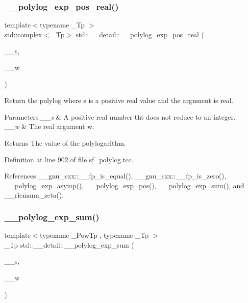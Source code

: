 \subsubsection{\texorpdfstring{\+\_\+\+\_\+polylog\+\_\+exp\+\_\+pos\+\_\+real()}{\_\_polylog\_exp\_pos\_real()}\hspace{0.1cm}{\footnotesize\ttfamily [2/2]}}
{\footnotesize\ttfamily template$<$typename \+\_\+\+Tp $>$ \\
std\+::complex$<$\+\_\+\+Tp$>$ std\+::\+\_\+\+\_\+detail\+::\+\_\+\+\_\+polylog\+\_\+exp\+\_\+pos\+\_\+real (\begin{DoxyParamCaption}\item[{\+\_\+\+Tp}]{\+\_\+\+\_\+s,  }\item[{\+\_\+\+Tp}]{\+\_\+\+\_\+w }\end{DoxyParamCaption})}

Return the polylog where s is a positive real value and the argument is real.


\begin{DoxyParams}{Parameters}
{\em \+\_\+\+\_\+s} & A positive real number tht does not reduce to an integer. \\
\hline
{\em \+\_\+\+\_\+w} & The real argument w. \\
\hline
\end{DoxyParams}
\begin{DoxyReturn}{Returns}
The value of the polylogarithm. 
\end{DoxyReturn}


Definition at line 902 of file sf\+\_\+polylog.\+tcc.



References \+\_\+\+\_\+gnu\+\_\+cxx\+::\+\_\+\+\_\+fp\+\_\+is\+\_\+equal(), \+\_\+\+\_\+gnu\+\_\+cxx\+::\+\_\+\+\_\+fp\+\_\+is\+\_\+zero(), \+\_\+\+\_\+polylog\+\_\+exp\+\_\+asymp(), \+\_\+\+\_\+polylog\+\_\+exp\+\_\+pos(), \+\_\+\+\_\+polylog\+\_\+exp\+\_\+sum(), and \+\_\+\+\_\+riemann\+\_\+zeta().

\mbox{\label{namespacestd_1_1____detail_acbdb1ad0debb8c919b4dcb1589af734c}} 
\subsubsection{\texorpdfstring{\+\_\+\+\_\+polylog\+\_\+exp\+\_\+sum()}{\_\_polylog\_exp\_sum()}}
{\footnotesize\ttfamily template$<$typename \+\_\+\+Pow\+Tp , typename \+\_\+\+Tp $>$ \\
\+\_\+\+Tp std\+::\+\_\+\+\_\+detail\+::\+\_\+\+\_\+polylog\+\_\+exp\+\_\+sum (\begin{DoxyParamCaption}\item[{\+\_\+\+Pow\+Tp}]{\+\_\+\+\_\+s,  }\item[{\+\_\+\+Tp}]{\+\_\+\+\_\+w }\end{DoxyParamCaption})}

